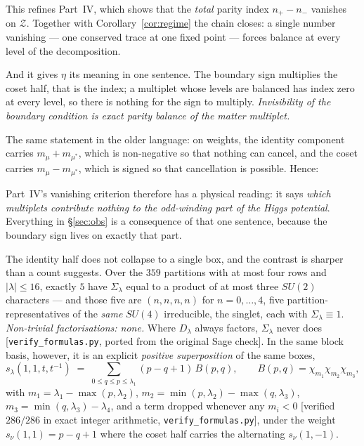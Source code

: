 \documentclass[11pt,a4paper]{article}
\newcommand{\su}[1]{SU(#1)}
\newcommand{\Sig}{\Sigma_\lambda}
\newcommand{\Dl}{D_\lambda}
\begin{document}
 This refines
Part~IV, which shows that the \emph{total} parity index $n_+-n_-$ vanishes on $\mathcal Z$. Together
with Corollary~\ref{cor:regime} the chain closes: a single number vanishing --- one conserved trace
at one fixed point --- forces balance at every level of the decomposition.

And it gives $\eta$ its meaning in one sentence. The boundary sign multiplies the coset half, that is
the index; a multiplet whose levels are balanced has index zero at every level, so there is nothing
for the sign to multiply. \emph{Invisibility of the boundary condition is exact parity balance of the
matter multiplet.}

\medskip
The same statement in the older language: on weights, the identity component carries
$m_\mu+m_{\mu^*}$, which is non-negative so that nothing can cancel, and the coset carries
$m_\mu-m_{\mu^*}$, which is signed so that cancellation is possible. Hence:

\begin{center}
\end{center}

\noindent Part~IV's vanishing criterion therefore has a physical reading: it says \emph{which
multiplets contribute nothing to the odd-winding part of the Higgs potential}. Everything in
\S\ref{sec:obs} is a consequence of that one sentence, because the boundary sign lives on exactly
that part.

The identity half does not collapse to a single box, and the contrast is sharper than a count
suggests. Over the $359$ partitions with at most four rows and $|\lambda|\le16$, exactly $5$ have
$\Sig$ equal to a product of at most three $\su2$ characters --- and those five are $(n,n,n,n)$ for
$n=0,\dots,4$, five partition-representatives of the \emph{same} $\su4$ irreducible, the singlet,
each with $\Sig\equiv1$. \emph{Non-trivial factorisations: none.} Where $\Dl$ always factors, $\Sig$
never does [\texttt{verify\_formulas.py}, ported from the original Sage check]. In the same block
basis, however, it is an explicit \emph{positive superposition} of the same boxes,
\begin{equation}\label{eq:evenstack}
s_\lambda(1,1,t,t^{-1}) \;=\; \sum_{0\le q\le p\le\lambda_1}(p-q+1)\,B(p,q),
\qquad B(p,q)=\chi_{m_1}\chi_{m_2}\chi_{m_3},
\end{equation}
with $m_1=\lambda_1-\max(p,\lambda_2)$, $m_2=\min(p,\lambda_2)-\max(q,\lambda_3)$,
$m_3=\min(q,\lambda_3)-\lambda_4$, and a term dropped whenever any $m_i<0$
[verified $286/286$ in exact integer arithmetic, \texttt{verify\_formulas.py}], under the weight
$s_\nu(1,1)=p-q+1$ where the coset half carries the
alternating $s_\nu(1,-1)$.
\end{document}
